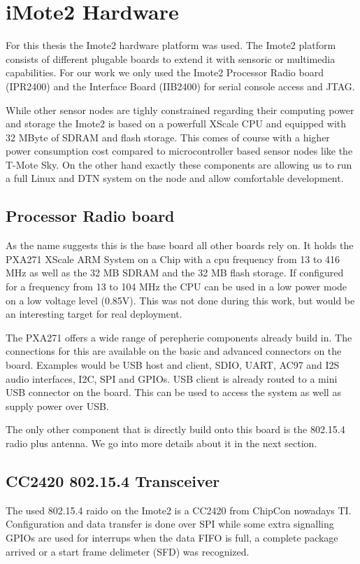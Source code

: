 \chapter{iMote2 Hardware}
For this thesis the Imote2 hardware platform was used. The Imote2 platform
consists of different plugable boards to extend it with sensoric or multimedia
capabilities. For our work we only used the Imote2 Processor Radio board
(IPR2400) and the Interface Board (IIB2400) for serial console access and JTAG.

While other sensor nodes are tighly constrained regarding their computing power
and storage the Imote2 is based on a powerfull XScale CPU and equipped with 32
MByte of SDRAM and flash storage. This comes of course with a higher power
consumption cost compared to microcontroller based sensor nodes like the T-Mote
Sky. On the other hand exactly these components are allowing us to run a full
Linux and DTN system on the node and allow comfortable development.

\section{Processor Radio board}
As the name suggests this is the base board all other boards rely on. It holds
the PXA271 XScale ARM System on a Chip with a cpu frequency from 13 to 416 MHz
as well as the 32 MB SDRAM and the 32 MB flash storage. If configured for a
frequency from 13 to 104 MHz the CPU can be used in a low power mode on a low
voltage level (0.85V). This was not done during this work, but would be an
interesting target for real deployment.

The PXA271 offers a wide range of perepherie components already build in. The
connections for this are available on the basic and advanced connectors on the
board. Examples would be USB host and client, SDIO, UART, AC97 and I2S audio
interfaces, I2C, SPI and GPIOs. USB client is already routed to a mini USB
connector on the board. This can be used to access the system as well as supply
power over USB.

The only other component that is directly build onto this board is the 802.15.4
radio plus antenna. We go into more details about it in the next section.

\section{CC2420 802.15.4 Transceiver}
The used 802.15.4 raido on the Imote2 is a CC2420 from ChipCon nowadays TI.
Configuration and data transfer is done over SPI while some extra signalling
GPIOs are used for interrups when the data FIFO is full, a complete package
arrived or a start frame delimeter (SFD) was recognized.

